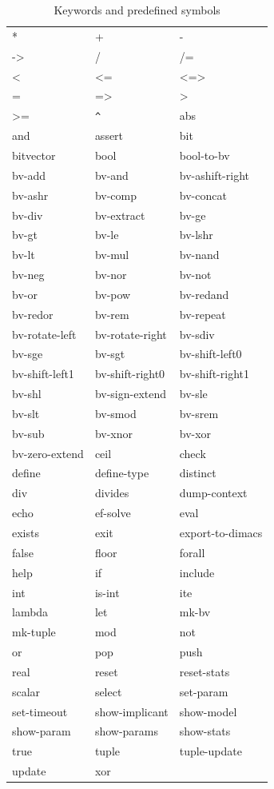 \documentclass[11pt,twoside,fleqn,openright,titlepage]{cslreport}
\begin{document}
\begin{table}
\begin{small}
\begin{center}
\begin{tt}
\begin{tabular}{|p{3.4cm}|p{3.4cm}|p{3.4cm}|}
\hline
* & + & - \\
-> & / & /= \\
< & <= & <=> \\
 = & => & > \\
>= & \verb|^| & abs \\
and & assert & bit \\
bitvector & bool & bool-to-bv \\
bv-add & bv-and & bv-ashift-right\\
bv-ashr & bv-comp & bv-concat \\
bv-div  & bv-extract & bv-ge \\
bv-gt  & bv-le & bv-lshr \\
bv-lt  & bv-mul & bv-nand \\
bv-neg & bv-nor & bv-not\\
bv-or  & bv-pow & bv-redand \\
bv-redor & bv-rem & bv-repeat \\
bv-rotate-left & bv-rotate-right & bv-sdiv \\
bv-sge & bv-sgt & bv-shift-left0 \\
bv-shift-left1 & bv-shift-right0 & bv-shift-right1 \\
bv-shl & bv-sign-extend & bv-sle \\
bv-slt & bv-smod & bv-srem \\
bv-sub & bv-xnor & bv-xor \\
bv-zero-extend & ceil & check \\
define & define-type & distinct \\
div & divides & dump-context \\
echo  & ef-solve & eval \\
exists & exit & export-to-dimacs \\
false & floor & forall \\
help & if & include \\
int & is-int & ite \\
lambda & let & mk-bv \\
mk-tuple & mod & not \\
or & pop & push \\
real & reset & reset-stats \\
scalar & select & set-param \\
set-timeout & show-implicant & show-model \\
show-param & show-params & show-stats\\
true & tuple & tuple-update \\
update & xor &  \\
\hline
\end{tabular}
\end{tt}
\end{center}
\end{small}
\caption{Keywords and predefined symbols}
\label{syntax:keywords}
\end{table}
\end{document}
